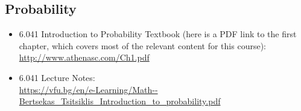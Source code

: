 \documentclass[11pt]{article} %
\begin{document}
\subsection{Probability}
\begin{itemize}
    \item 6.041 Introduction to Probability Textbook (here is a PDF link to the first chapter, which covers most of the relevant content for this course):\\ {\footnotesize \url{http://www.athenasc.com/Ch1.pdf}}
    \item 6.041 Lecture Notes: \\ 
    {\footnotesize \url{https://vfu.bg/en/e-Learning/Math--Bertsekas_Tsitsiklis_Introduction_to_probability.pdf}}
\end{itemize}
\end{document}
